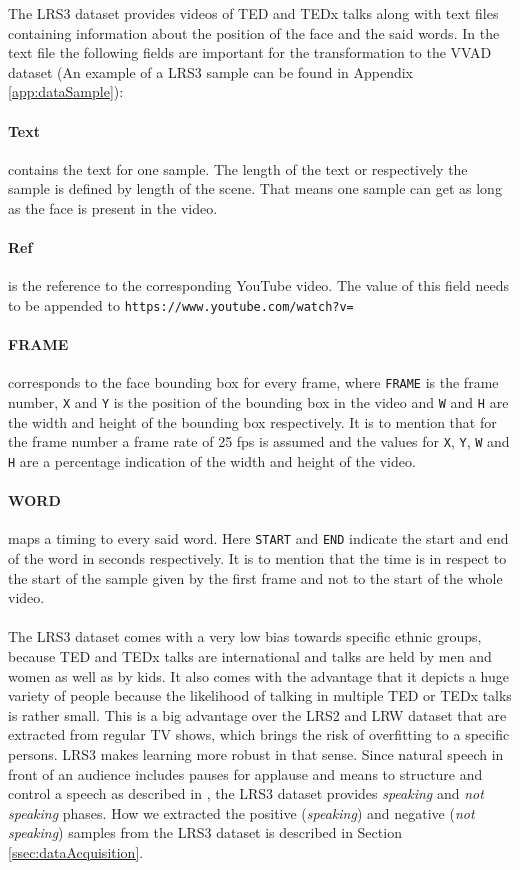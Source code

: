 The LRS3 dataset provides videos of TED and TEDx talks along with text files containing information about the position of the face and the said words.
In the text file the following fields are important for the transformation to the VVAD dataset (An example of a LRS3 sample can be found in Appendix \ref{app:dataSample}):
\paragraph{Text} contains the text for one sample. The length of the text or respectively the sample is defined by length of the scene. 
That means one sample can get as long as the face is present in the video.
\paragraph{Ref} is the reference to the corresponding YouTube video. The value of this field needs to be appended to \texttt{https://www.youtube.com/watch?v=}
\paragraph{FRAME} corresponds to the face bounding box for every frame, where \texttt{FRAME} is the frame number, \texttt{X} and \texttt{Y} is the position of the bounding box in the video and \texttt{W} and \texttt{H} are the width and height of the bounding box respectively. It is to mention that for the frame number a frame rate of 25 fps is assumed and the values for \texttt{X}, \texttt{Y}, \texttt{W} and \texttt{H} are a percentage indication of the width and height of the video.
\paragraph{WORD} maps a timing to every said word. Here \texttt{START} and \texttt{END} indicate the start and end of the word in seconds respectively. 
It is to mention that the time is in respect to the start of the sample given by the first frame and not to the start of the whole video.
\paragraph{}%

The LRS3 dataset comes with a very low bias towards specific ethnic groups, because TED and TEDx talks are international and talks are held by men and women as well as by kids. 
It also comes with the advantage that it depicts a huge variety of people because the likelihood of talking in multiple TED or TEDx talks is rather small.
This is a big advantage over the LRS2 and LRW dataset that are extracted from regular TV shows, which brings the risk of overfitting to a specific persons. 
LRS3 makes learning more robust in that sense. 
Since natural speech in front of an audience includes pauses for applause and means to structure and control a speech as described in \cite{Nikitina2011}, the LRS3 dataset provides \emph{speaking} and \emph{not speaking} phases.
How we extracted the positive (\emph{speaking}) and negative (\emph{not speaking}) samples from the LRS3 dataset is described in Section \ref{ssec:dataAcquisition}.


